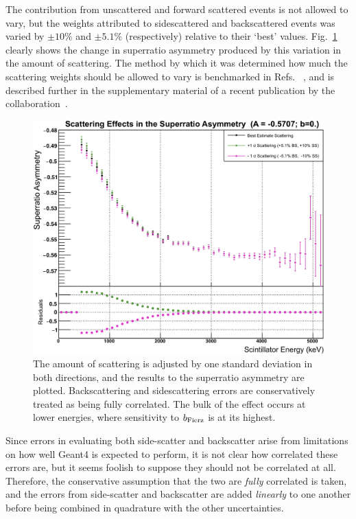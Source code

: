 The contribution from unscattered and forward scattered events is not allowed to vary, but the weights attributed to sidescattered and backscattered events was varied by $\pm 10\%$ and $\pm 5.1\%$ (respectively) relative to their `best' values.  Fig.~\ref{fig:asymmetry_scattering} clearly shows the change in superratio asymmetry produced by this variation in the amount of scattering.  The method by which it was determined how much the scattering weights should be allowed to vary is benchmarked in Refs.~\cite{stragglingLonergan1970} \cite{stragglingRester1971}, and is described further in the supplementary material of a recent publication by the collaboration~\cite{ben_Abeta}.

\begin{figure}[h!tb]
	\centering
	\includegraphics[width=.999\linewidth]{Figures/ScatteringEstimate.png}
	\caption[Scattering Effects in the Asymmetry]{The amount of scattering is adjusted by one standard deviation in both directions, and the results to the superratio asymmetry are plotted.  Backscattering and sidescattering errors are conservatively treated as being fully correlated.  The bulk of the effect occurs at lower energies, where sensitivity to $b_{\mathrm{Fierz}}$ is at its highest.  }	
	\label{fig:asymmetry_scattering}
\end{figure}

Since errors in evaluating both side-scatter and backscatter arise from limitations on how well Geant4 is expected to perform, it is not clear how correlated these errors are, but it seems foolish to suppose they should not be correlated at all.  Therefore, the conservative assumption that the two are \emph{fully} correlated is taken, and the errors from side-scatter and backscatter are added \emph{linearly} to one another before being combined in quadrature with the other uncertainties.  

